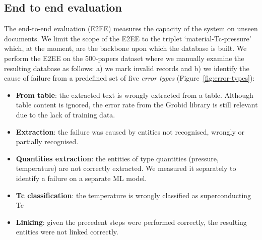 \documentclass{article}
\begin{document}


\subsection{End to end evaluation}

The end-to-end evaluation (E2EE) measures the capacity of the system on unseen documents.
We limit the scope of the E2EE to the triplet `material-Tc-pressure' which, at the moment, are the backbone upon which the database is built.
We perform the E2EE on the 500-papers dataset where we manually examine the resulting database as follows: a) we mark invalid records and b) we identify the cause of failure from a predefined set of five \textit{error types} (Figure~\ref{fig:error-types}):  
\begin{itemize}
    \item \textbf{From table}: the extracted text is wrongly extracted from a table. Although table content is ignored, the error rate from the Grobid library is still relevant due to the lack of training data. 
    \item \textbf{Extraction}: the failure was caused by entities not recognised, wrongly or partially recognised.
    \item \textbf{Quantities extraction}: the entities of type quantities (pressure, temperature) are not correctly extracted. We measured it separately to identify a failure on a separate ML model.  
    \item \textbf{Tc classification}: the temperature is wrongly classified as superconducting Tc
    \item \textbf{Linking}: given the precedent steps were performed correctly, the resulting entities were not linked correctly. 
\end{itemize}
\end{document}

